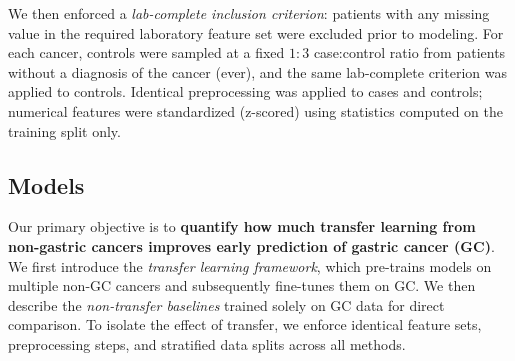 \documentclass[diagnostics,article,submit,pdftex,moreauthors]{Definitions/mdpi}
\begin{document}
We then enforced a \emph{lab-complete inclusion criterion}: patients with any missing value in the required laboratory feature set were excluded prior to modeling.
For each cancer, controls were sampled at a fixed $1{:}3$ case:control ratio from patients without a diagnosis of the cancer (ever), and the same lab-complete criterion was applied to controls.
Identical preprocessing was applied to cases and controls; numerical features were standardized (z-scored) using statistics computed on the training split only.





\subsection{Models}
Our primary objective is to \textbf{quantify how much transfer learning from non-gastric cancers improves early prediction of gastric cancer (GC)}. 
We first introduce the \emph{transfer learning framework}, which pre-trains models on multiple non-GC cancers and subsequently fine-tunes them on GC.
We then describe the \emph{non-transfer baselines} trained solely on GC data for direct comparison.
To isolate the effect of transfer, we enforce identical feature sets, preprocessing steps, and stratified data splits across all methods.
\end{document}
